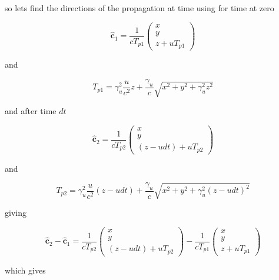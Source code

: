 so lets find the directions of the propagation at time using for time at zero

\begin{equation}
	\mathbf{\hat{c}}_1 = \frac{1}{c T_{p1}}
	\begin{pmatrix}
		x \\
		y \\
		z + u T_{p1}
	\end{pmatrix}
\end{equation}

and

\begin{equation}
	T_{p1} = \gamma_u^2 \frac{u}{c^2}z + \frac{\gamma_u}{c} \sqrt{x^2 + y^2 + \gamma_u^2 z^2}
\end{equation}

and after time $dt$

\begin{equation}
	\mathbf{\hat{c}}_2 = \frac{1}{c T_{p2}}
	\begin{pmatrix}
		x \\
		y \\
		(z - u dt) + u T_{p2}
	\end{pmatrix}
\end{equation}

and

\begin{equation}
	T_{p2} = \gamma_u^2 \frac{u}{c^2} (z - u dt) + \frac{\gamma_u}{c} \sqrt{x^2 + y^2 + \gamma_u^2 (z - u dt)^2}
\end{equation}

giving

\begin{equation}
	\mathbf{\hat{c}}_2 - \mathbf{\hat{c}}_1 = \frac{1}{c T_{p2}}
	\begin{pmatrix}
		x \\
		y \\
		(z - u dt) + u T_{p2}
	\end{pmatrix}
	-
	\frac{1}{c T_{p1}}
	\begin{pmatrix}
		x \\
		y \\
		z + u T_{p1}
	\end{pmatrix}
\end{equation}

which gives

